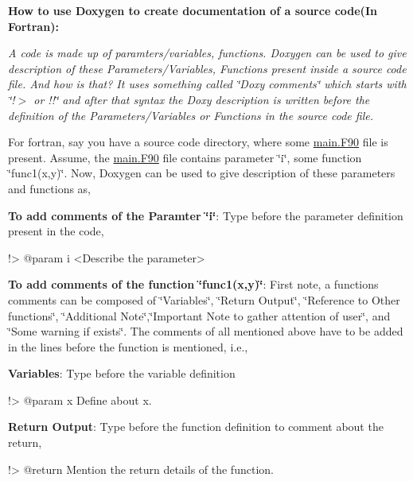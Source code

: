\label{md_code_subpage1_sp1}%
%


{\bfseries{How to use Doxygen to create documentation of a source code(\+In Fortran)\+:}}

 {\itshape A code is made up of paramters/variables, functions. Doxygen can be used to give description of these Parameters/\+Variables, Functions present inside a source code file. And how is that? It uses something called \char`\"{}\+Doxy comments\char`\"{} which starts with \char`\"{}!$>$ or !!\char`\"{} and after that syntax the Doxy description is written before the definition of the Parameters/\+Variables or Functions in the source code file.}



For fortran, say you have a source code directory, where some \mbox{\hyperlink{main_8_f90}{main.\+F90}} file is present. Assume, the \mbox{\hyperlink{main_8_f90}{main.\+F90}} file contains parameter \char`\"{}i\char`\"{}, some function \char`\"{}func1(x,y)\char`\"{}. Now, Doxygen can be used to give description of these parameters and functions as,
\begin{DoxyEnumerate}
\item {\bfseries{To add comments of the Paramter \char`\"{}i\char`\"{}}}\+: Type before the parameter definition present in the code, \begin{DoxyVerb}!> @param i <Describe the parameter> \end{DoxyVerb}

\item {\bfseries{To add comments of the function \char`\"{}func1(x,y)\char`\"{}}}\+: First note, a function\textquotesingle{}s comments can be composed of \char`\"{}\+Variables\char`\"{}, \char`\"{}\+Return Output\char`\"{}, \char`\"{}\+Reference to Other functions\char`\"{}, \char`\"{}\+Additional Note\char`\"{},\char`\"{}\+Important Note to gather attention of user\char`\"{}, and \char`\"{}\+Some warning if exists\char`\"{}. The comments of all mentioned above have to be added in the lines before the function is mentioned, i.\+e.,
\end{DoxyEnumerate}

{\bfseries{Variables}}\+: Type before the variable definition \begin{DoxyVerb}!> @param x Define about x. \end{DoxyVerb}


{\bfseries{Return Output}}\+: Type before the function definition to comment about the return, \begin{DoxyVerb}!> @return Mention the return details of the function.  \end{DoxyVerb}


